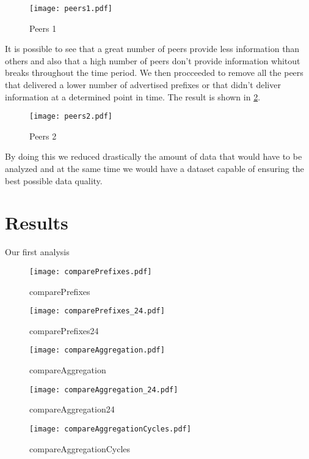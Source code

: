 \documentclass[11pt,a4paper]{scrreprt}
\begin{document}
\begin{figure}[h!]
\centering
\texttt{[image: peers1.pdf]}
\caption{Peers 1}
\label{fig:peers1}
\end{figure}

It is possible to see that a great number of peers provide less information than others and also that a high number of peers don't provide information whitout breaks throughout the time period. We then procceeded to remove all the peers that delivered a lower number of advertised prefixes or that didn't deliver information at a determined point in time. The result is shown in \ref{fig:peers2}.  

\begin{figure}[h!]
\centering
\texttt{[image: peers2.pdf]}
\caption{Peers 2}
\label{fig:peers2}
\end{figure}

By doing this we reduced drastically the amount of data that would have to be analyzed and at the same time we would have a dataset capable of ensuring the best possible data quality. 

\chapter{Results}

Our first analysis  

\begin{figure}[h!]
\centering
\texttt{[image: comparePrefixes.pdf]}
\caption{comparePrefixes}
\label{fig:comparePrefixes}
\end{figure}

\begin{figure}[h!]
\centering
\texttt{[image: comparePrefixes\_24.pdf]}
\caption{comparePrefixes24}
\label{fig:comparePrefixes_24}
\end{figure}

\begin{figure}[h!]
\centering
\texttt{[image: compareAggregation.pdf]}
\caption{compareAggregation}
\label{fig:compareAggregation}
\end{figure}

\begin{figure}[h!]
\centering
\texttt{[image: compareAggregation\_24.pdf]}
\caption{compareAggregation24}
\label{fig:compareAggregation24}
\end{figure}

\begin{figure}[h!]
\centering
\texttt{[image: compareAggregationCycles.pdf]}
\caption{compareAggregationCycles}
\label{fig:compareAggregationCycles}
\end{figure}
\end{document}
